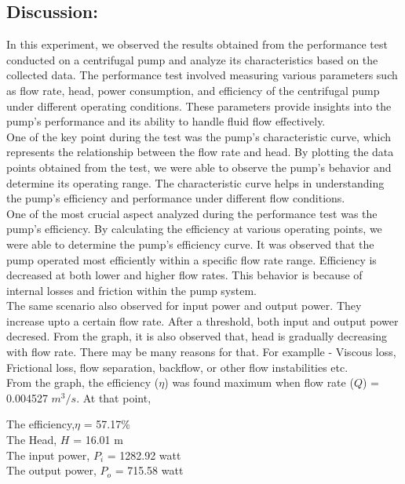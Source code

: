\documentclass[12pt]{article}
\begin{document}
\subsection*{Discussion:}
In this experiment, we observed the results obtained from the performance test conducted on a centrifugal pump and analyze its characteristics based on the collected data. The performance test involved measuring various parameters such as flow rate, head, power consumption, and efficiency of the centrifugal pump under different operating conditions. These parameters provide insights into the pump's performance and its ability to handle fluid flow effectively.\\

One of the key point during the test was the pump's characteristic curve, which represents the relationship between the flow rate and head. By plotting the data points obtained from the test, we were able to observe the pump's behavior and determine its operating range. The characteristic curve helps in understanding the pump's efficiency and performance under different flow conditions.\\ 

One of the most crucial aspect analyzed during the performance test was the pump's efficiency. By calculating the efficiency at various operating points, we were able to determine the pump's efficiency curve. It was observed that the pump operated most efficiently within a specific flow rate range. Efficiency is decreased at both lower and higher flow rates. This behavior is because of internal losses and friction within the pump system.\\

The same scenario also observed for input power and output power. They increase upto a certain flow rate. After a threshold, both input and output power decresed. From the graph, it is also observed that, head is gradually decreasing with flow rate. There may be many reasons for that. For examplle - Viscous loss, Frictional loss,  flow separation, backflow, or other flow instabilities etc. \\

From the graph, the efficiency ($\eta$) was found maximum when flow rate ($Q$) = 0.004527 $m^3/s$. At that point,
\begin{center}
  The efficiency,$\eta$ = 57.17\% \\
  The Head, $H$ = 16.01 m \\
  The input power, $P_i$ = 1282.92 watt \\
  The output power, $P_o$ = 715.58 watt \\ 
\end{center}
\end{document}
